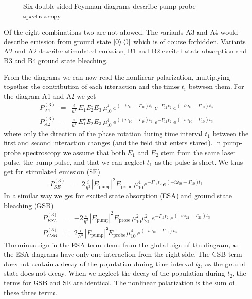 \begin{figure}
\caption{
Six double-sided Feynman diagrams describe pump-probe spectroscopy.}
\label{fig:2d_feynman_pump_probe}
\end{figure}

Of the eight combinations two are not allowed. The variants A3 and A4 would describe  emission from ground state  $\ket{0} \bra{0}$ which is of course forbidden. Variants A2 and A2 describe stimulated emission, B1 and B2 excited state absorption and B3 and B4 ground state bleaching.

From the diagrams we can now read the nonlinear polarization, multiplying together the contribution of each interaction and the times $t_i$ between them.
For the diagram A1 and A2 we get
\begin{eqnarray}
P^{(3)}_{A1} & =& \frac{i}{\hbar^3} \,  E_1 E_2^\star E_3 \, \mu_{10}^4 \,
e^{ (-i \omega_{10} - \Gamma_{10}) t_1 } \,
e^{  - \Gamma_{11} t_2 } \,
e^{ (-i \omega_{10} - \Gamma_{10}) t_3 }  \\
P^{(3)}_{A2} & =& \frac{i}{\hbar^3} \,  E_1^\star E_2 E_3 \, \mu_{10}^4 \,
e^{ (+i \omega_{10} - \Gamma_{10}) t_1 } \,
e^{  - \Gamma_{11} t_2 } \,
e^{ (-i \omega_{10} - \Gamma_{10}) t_3 }  
\end{eqnarray}
where only the direction of the phase rotation during time interval $t_1$ between the first and second interaction changes (and the field that enters stared). In pump-probe spectroscopy we assume that both $E_1$ and $E_2$ stem from the same laser pulse, the pump pulse, and that we can neglect $t_1$ as the pulse is short. We thus get for stimulated emission (SE)
\begin{eqnarray}
P^{(3)}_{SE} & =& 2 \frac{i}{\hbar^3} \,  | E_\text{pump}|^2 E_\text{probe} \, \mu_{10}^4 \,
e^{  - \Gamma_{11} t_2 } \,
e^{ (-i \omega_{10} - \Gamma_{10}) t_3 } 
\end{eqnarray}
In a similar way we get for excited state absorption (ESA) and ground state bleaching (GSB)
\begin{eqnarray}
P^{(3)}_{ESA} & =& -2 \frac{i}{\hbar^3} \,  | E_\text{pump}|^2 E_\text{probe} \, \mu_{10}^2 \mu_{21}^2 \,
e^{  - \Gamma_{11} t_2 } \,
e^{ (-i \omega_{21} - \Gamma_{21}) t_3 }  \\
P^{(3)}_{GSB}  & =& 2 \frac{i}{\hbar^3} \,  | E_\text{pump}|^2 E_\text{probe} \, \mu_{10}^4 \,
e^{ (-i \omega_{10} - \Gamma_{10}) t_3 } 
\end{eqnarray}
The minus sign in the ESA term stems from the global sign of the diagram, as the ESA diagrams have only one interaction from the right side. The GSB term does not contain a decay of the population during time interval $t_2$, as the ground state does not decay. When we neglect the decay of the population during $t_2$, the terms for GSB and SE are identical. The nonlinear polarization is the sum of these three terms.


